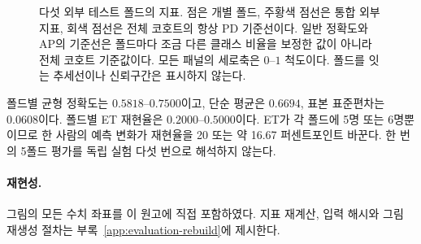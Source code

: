 \begin{figure}[H]
\caption{다섯 외부 테스트 폴드의 지표. 점은 개별 폴드, 주황색 점선은
통합 외부 지표, 회색 점선은 전체 코호트의 항상 PD 기준선이다.
일반 정확도와 AP의 기준선은 폴드마다 조금 다른 클래스 비율을 보정한 값이
아니라 전체 코호트 기준값이다. 모든 패널의 세로축은 \(0\)--\(1\) 척도이다.
폴드를 잇는 추세선이나 신뢰구간은 표시하지 않는다.}
\label{fig:evaluation-folds}
\end{figure}

폴드별 균형 정확도는 \(0.5818\)--\(0.7500\)이고,
단순 평균은 \(0.6694\), 표본 표준편차는 \(0.0608\)이다.
폴드별 ET 재현율은 \(0.2000\)--\(0.5000\)이다.
ET가 각 폴드에 5명 또는 6명뿐이므로 한 사람의 예측 변화가 재현율을
20 또는 약 16.67 퍼센트포인트 바꾼다.
한 번의 5폴드 평가를 독립 실험 다섯 번으로 해석하지 않는다.

\paragraph{재현성.}
그림의 모든 수치 좌표를 이 원고에 직접 포함하였다.
지표 재계산, 입력 해시와 그림 재생성 절차는 부록~\ref{app:evaluation-rebuild}에 제시한다.
\clearpage

